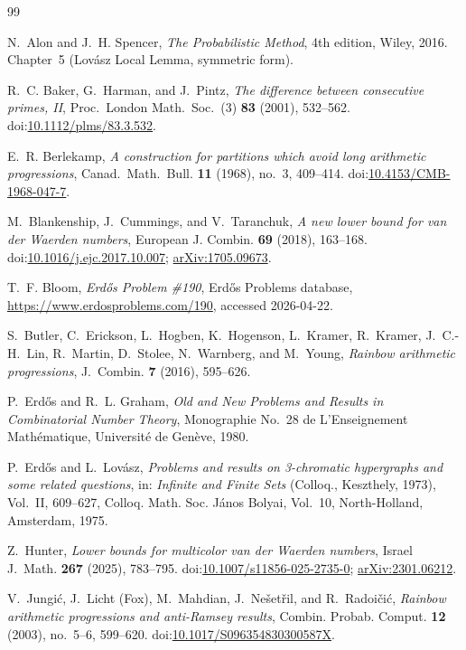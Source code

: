 \documentclass[11pt,reqno,a4paper]{amsart}
\theoremstyle{plain}
\theoremstyle{definition}
\theoremstyle{remark}
\numberwithin{equation}{section}
\begin{document}
\begin{thebibliography}{99}

N.~Alon and J.~H. Spencer,
\emph{The Probabilistic Method}, 4th edition,
Wiley, 2016.
Chapter~5 (Lov\'asz Local Lemma, symmetric form).

R.~C. Baker, G.~Harman, and J.~Pintz,
\emph{The difference between consecutive primes, II},
Proc.~London Math.~Soc.~(3) \textbf{83} (2001), 532--562.
doi:\href{https://doi.org/10.1112/plms/83.3.532}{10.1112/plms/83.3.532}.

E.~R. Berlekamp,
\emph{A construction for partitions which avoid long arithmetic
  progressions},
Canad.~Math.~Bull. \textbf{11} (1968), no.~3, 409--414.
doi:\href{https://doi.org/10.4153/CMB-1968-047-7}{10.4153/CMB-1968-047-7}.

M.~Blankenship, J.~Cummings, and V.~Taranchuk,
\emph{A new lower bound for van der Waerden numbers},
European J. Combin. \textbf{69} (2018), 163--168.
doi:\href{https://doi.org/10.1016/j.ejc.2017.10.007}{10.1016/j.ejc.2017.10.007};
\href{https://arxiv.org/abs/1705.09673}{arXiv:1705.09673}.

T.~F. Bloom,
\emph{Erd\H{o}s Problem \#190},
Erd\H{o}s Problems database,
\url{https://www.erdosproblems.com/190}, accessed 2026-04-22.

S.~Butler, C.~Erickson, L.~Hogben, K.~Hogenson, L.~Kramer,
R.~Kramer, J.~C.-H.~Lin, R.~Martin, D.~Stolee, N.~Warnberg, and
M.~Young,
\emph{Rainbow arithmetic progressions},
J.~Combin. \textbf{7} (2016), 595--626.

P.~Erd\H{o}s and R.~L. Graham,
\emph{Old and New Problems and Results in Combinatorial Number Theory},
Monographie No.~28 de L'Enseignement Math\'ematique,
Universit\'e de Gen\`eve, 1980.

P.~Erd\H{o}s and L.~Lov\'asz,
\emph{Problems and results on 3-chromatic hypergraphs and some
  related questions},
in: \emph{Infinite and Finite Sets} (Colloq., Keszthely, 1973),
Vol.~II, 609--627, Colloq. Math. Soc. J\'anos Bolyai, Vol.~10,
North-Holland, Amsterdam, 1975.

Z.~Hunter,
\emph{Lower bounds for multicolor van der Waerden numbers},
Israel J.~Math. \textbf{267} (2025), 783--795.
doi:\href{https://doi.org/10.1007/s11856-025-2735-0}{10.1007/s11856-025-2735-0};
\href{https://arxiv.org/abs/2301.06212}{arXiv:2301.06212}.

V.~Jungi\'c, J.~Licht (Fox), M.~Mahdian, J.~Ne\v{s}et\v{r}il,
and R.~Radoi\v{c}i\'c,
\emph{Rainbow arithmetic progressions and anti-Ramsey results},
Combin. Probab. Comput. \textbf{12} (2003), no.~5--6, 599--620.
doi:\href{https://doi.org/10.1017/S096354830300587X}{10.1017/S096354830300587X}.

\end{thebibliography}
\end{document}
